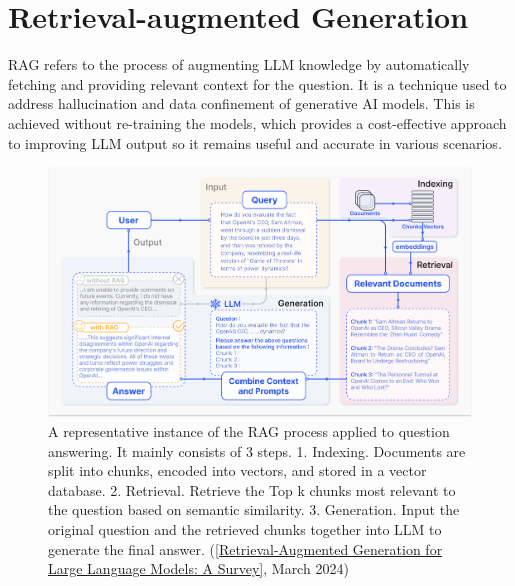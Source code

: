 \section{Retrieval-augmented Generation}
RAG refers to the process of augmenting LLM knowledge by automatically fetching and providing relevant context for the question. It is a technique used to address hallucination and data confinement of generative AI models. This is achieved without re-training the models, which provides a cost-effective approach to improving LLM output so it remains useful and accurate in various scenarios.
\begin{figure}[htbp]
    \centering
    \includegraphics[width=\linewidth]{./figures/RAG_case.png}
    \caption{A representative instance of the RAG process applied to question answering. It mainly consists of 3 steps. 1. Indexing. Documents are split into chunks, encoded into vectors, and stored in a vector database. 2. Retrieval. Retrieve the Top k chunks most relevant to the question based on semantic similarity. 3. Generation. Input the original question and the retrieved chunks together into LLM to generate the final answer. (\href{https://arxiv.org/html/2312.10997v5}{[Retrieval-Augmented Generation for Large Language Models: A Survey]}, March 2024)}
\end{figure}
\newpage

